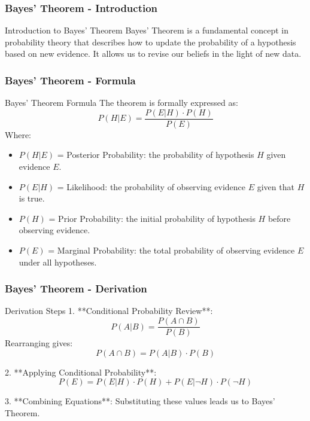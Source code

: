 \documentclass[aspectratio=169]{beamer}
\begin{document}
\begin{frame}[fragile]
    \frametitle{Bayes' Theorem - Introduction}
    \begin{block}{Introduction to Bayes' Theorem}
        Bayes' Theorem is a fundamental concept in probability theory that describes how to update the probability of a hypothesis based on new evidence. It allows us to revise our beliefs in the light of new data.
    \end{block}
\end{frame}

\begin{frame}[fragile]
    \frametitle{Bayes' Theorem - Formula}
    \begin{block}{Bayes' Theorem Formula}
        The theorem is formally expressed as:
        \begin{equation}
            P(H|E) = \frac{P(E|H) \cdot P(H)}{P(E)}
        \end{equation}
        Where:
        \begin{itemize}
            \item $P(H|E)$ = Posterior Probability: the probability of hypothesis $H$ given evidence $E$.
            \item $P(E|H)$ = Likelihood: the probability of observing evidence $E$ given that $H$ is true.
            \item $P(H)$ = Prior Probability: the initial probability of hypothesis $H$ before observing evidence.
            \item $P(E)$ = Marginal Probability: the total probability of observing evidence $E$ under all hypotheses.
        \end{itemize}
    \end{block}
\end{frame}

\begin{frame}[fragile]
    \frametitle{Bayes' Theorem - Derivation}
    \begin{block}{Derivation Steps}
        1. **Conditional Probability Review**:
           \[
           P(A|B) = \frac{P(A \cap B)}{P(B)}
           \]
           Rearranging gives:
           \[
           P(A \cap B) = P(A|B) \cdot P(B)
           \]

        2. **Applying Conditional Probability**:
           \[
           P(E) = P(E|H) \cdot P(H) + P(E|\neg H) \cdot P(\neg H)
           \]

        3. **Combining Equations**: 
           Substituting these values leads us to Bayes' Theorem.
    \end{block}
\end{frame}
\end{document}
